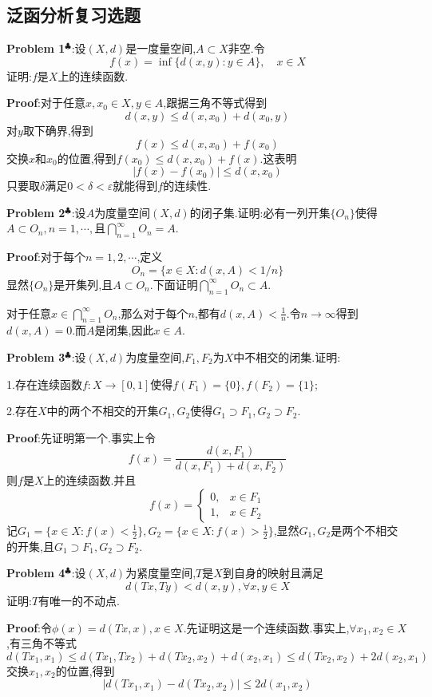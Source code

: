  \subsection{泛函分析复习选题}
\textbf{Problem 1}$^\clubsuit $:设$(X,d)$是一度量空间,$A\subset X$非空.令
$$
f(x)=\inf\{d(x,y):y\in A\},\quad x\in X
$$
证明:$f$是$X$上的连续函数.\par
\textbf{Proof}:对于任意$x,x_0\in X,y\in A$,跟据三角不等式得到
$$
d(x,y)\leqslant d(x,x_0)+d(x_0,y)
$$
对$y$取下确界,得到
$$
f(x)\leqslant d(x,x_0)+f(x_0)
$$
交换$x$和$x_0$的位置,得到$f(x_0)\leqslant d(x,x_0)+f(x)$.这表明
$$
|f(x)-f(x_0)|\leqslant d(x,x_0)
$$
只要取$\delta$满足$0<\delta<\varepsilon$就能得到$f$的连续性.\par
\textbf{Problem 2}$^\clubsuit $:设$A$为度量空间$(X,d)$的闭子集.证明:必有一列开集$\{O_n\}$使得$A\subset O_n,n=1,\cdots,$且$\bigcap_{n=1}^{\infty}O_n=A$.\par
\textbf{Proof}:对于每个$n=1,2,\cdots$,定义
$$
O_n=\{x\in X:d(x,A)<1/n\}
$$
显然$\{O_n\}$是开集列,且$A\subset O_n$.下面证明$\bigcap_{n=1}^{\infty}O_n\subset A$.\par
对于任意$x\in \bigcap_{n=1}^{\infty}O_n$,那么对于每个$n$,都有$d(x,A)<\frac{1}{n}$.令$n\to\infty$得到$d(x,A)=0$.而$A$是闭集,因此$x\in A$.\par
\textbf{Problem 3}$^\clubsuit $:设$(X,d)$为度量空间,$F_1,F_2$为$X$中不相交的闭集.证明:\par
1.存在连续函数$f:X\to [0,1]$使得$f(F_1)=\{0\},f(F_2)=\{1\}$;\par
2.存在$X$中的两个不相交的开集$G_1,G_2$使得$G_1\supset F_1,G_2\supset F_2$.\par
\textbf{Proof}:先证明第一个.事实上令
$$
f(x)=\frac{d(x,F_1)}{d(x,F_1)+d(x,F_2)}
$$
则$f$是$X$上的连续函数.并且
$$
f(x)=
\begin{cases}
0, & x\in F_1\\[4pt]
1, & x\in F_2
\end{cases}
$$
记$G_1=\{x\in X:f(x)<\frac{1}{2}\},G_2=\{x\in X:f(x)>\frac{1}{2}\}$,显然$G_1,G_2$是两个不相交的开集,且$G_1\supset F_1,G_2\supset F_2$.\par
\textbf{Problem 4}$^\clubsuit $:设$(X,d)$为紧度量空间,$T$是$X$到自身的映射且满足
$$
d(Tx,Ty)< d(x,y),\forall x,y\in X
$$
证明:$T$有唯一的不动点.\par
\textbf{Proof}:令$\phi(x)=d(Tx,x),x\in X$.先证明这是一个连续函数.事实上,$\forall x_1,x_2\in X$,有三角不等式
$$
d(Tx_1,x_1)\leqslant d(Tx_1,Tx_2)+d(Tx_2,x_2)+d(x_2,x_1)\leqslant d(Tx_2,x_2)+2d(x_2,x_1)
$$
交换$x_1,x_2$的位置,得到
$$
|d(Tx_1,x_1)-d(Tx_2,x_2)|\leqslant 2d(x_1,x_2)
$$

